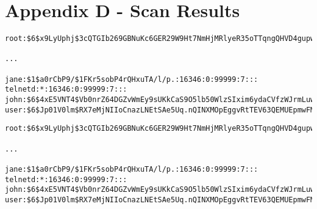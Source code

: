 \section{Appendix D - Scan Results}



\lstset{extendedchars=\true}
\lstset{inputencoding=ansinew}

\begin{lstlisting}
root:$6$x9LyUphj$3cQTGIb269GBNuKc6GER29W9Ht7NmHjMRlyeR35oTTqngQHVD4gupwzSmjhAYOc6KEyfGQ32De27SgOCNzKcE.:16371:0:99999:7:::

...

jane:$1$a0rCbP9/$1FKr5sobP4rQHxuTA/l/p.:16346:0:99999:7:::
telnetd:*:16346:0:99999:7:::
john:$6$4xE5VNT4$Vb0nrZ64DGZvWmEy9sUKkCaS9O5lb50WlzSIxim6ydaCVfzWJrmLuwZIPxjgw1ZDIeQB9C9jX7qb7AtiDibjo0:16346:0:99999:7:::
user:$6$Jp01V0lm$RX7eMjNIIoCnazLNEtSAe5Uq.nQINXMOpEggvRtTEV63QEMUEpmwFMJhYzQtLT/M33Kbl5Mhr59tPJbvN/u4k1:16346:0:99999:7:::
\end{lstlisting}

\begin{lstlisting}
root:$6$x9LyUphj$3cQTGIb269GBNuKc6GER29W9Ht7NmHjMRlyeR35oTTqngQHVD4gupwzSmjhAYOc6KEyfGQ32De27SgOCNzKcE.:16371:0:99999:7:::

...

jane:$1$a0rCbP9/$1FKr5sobP4rQHxuTA/l/p.:16346:0:99999:7:::
telnetd:*:16346:0:99999:7:::
john:$6$4xE5VNT4$Vb0nrZ64DGZvWmEy9sUKkCaS9O5lb50WlzSIxim6ydaCVfzWJrmLuwZIPxjgw1ZDIeQB9C9jX7qb7AtiDibjo0:16346:0:99999:7:::
user:$6$Jp01V0lm$RX7eMjNIIoCnazLNEtSAe5Uq.nQINXMOpEggvRtTEV63QEMUEpmwFMJhYzQtLT/M33Kbl5Mhr59tPJbvN/u4k1:16346:0:99999:7:::
\end{lstlisting}